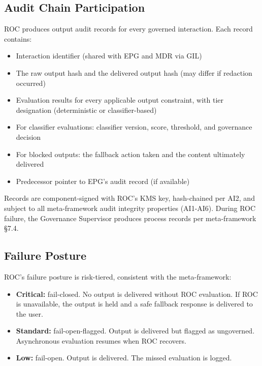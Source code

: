 \subsection{Audit Chain Participation}


ROC produces output audit records for every governed interaction. Each record contains:

\begin{itemize}
  \item Interaction identifier (shared with EPG and MDR via GIL)
  \item The raw output hash and the delivered output hash (may differ if redaction occurred)
  \item Evaluation results for every applicable output constraint, with tier designation (deterministic or classifier-based)
  \item For classifier evaluations: classifier version, score, threshold, and governance decision
  \item For blocked outputs: the fallback action taken and the content ultimately delivered
  \item Predecessor pointer to EPG's audit record (if available)
\end{itemize}


Records are component-signed with ROC's KMS key, hash-chained per AI2, and subject to all meta-framework audit integrity properties (AI1-AI6). During ROC failure, the Governance Supervisor produces process records per meta-framework \S{}7.4.

\subsection{Failure Posture}


ROC's failure posture is risk-tiered, consistent with the meta-framework:

\begin{itemize}
  \item \textbf{Critical:} fail-closed. No output is delivered without ROC evaluation. If ROC is unavailable, the output is held and a safe fallback response is delivered to the user.
  \item \textbf{Standard:} fail-open-flagged. Output is delivered but flagged as ungoverned. Asynchronous evaluation resumes when ROC recovers.
  \item \textbf{Low:} fail-open. Output is delivered. The missed evaluation is logged.
\end{itemize}


